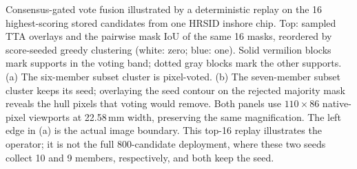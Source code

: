 Consensus-gated vote fusion illustrated by a deterministic replay on the 16 highest-scoring stored candidates from one HRSID inshore chip. Top: sampled TTA overlays and the pairwise mask IoU of the same 16 masks, reordered by score-seeded greedy clustering (white: zero; blue: one). Solid vermilion blocks mark supports in the voting band; dotted gray blocks mark the other supports. (a) The six-member subset cluster is pixel-voted. (b) The seven-member subset cluster keeps its seed; overlaying the seed contour on the rejected majority mask reveals the hull pixels that voting would remove. Both panels use $110\times86$ native-pixel viewports at 22.58\,mm width, preserving the same magnification. The left edge in (a) is the actual image boundary. This top-16 replay illustrates the operator; it is not the full 800-candidate deployment, where these two seeds collect 10 and 9 members, respectively, and both keep the seed.
